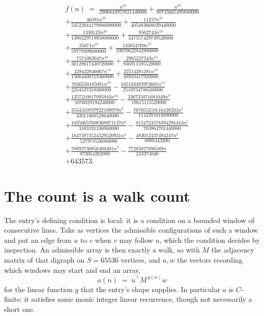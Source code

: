 \documentclass[11pt,a4paper]{article}
\theoremstyle{plain}
\theoremstyle{definition}
\begin{document}
\begin{multline*}
f(n)\;=\;\frac{n^{24}}{2906843957821440000} + \frac{n^{23}}{80745665495040000} \\
+ \frac{46391 n^{22}}{53523844179886080000} + \frac{11257 n^{21}}{405483668029440000} \\
+ \frac{1330123 n^{20}}{1390229718958080000} + \frac{8502743 n^{19}}{347557429739520000} \\
+ \frac{35671 n^{18}}{59779399680000} + \frac{133834769 n^{17}}{10670622842880000} \\
+ \frac{7571063047 n^{16}}{30128817438720000} + \frac{2965237343 n^{15}}{836911595520000} \\
+ \frac{328422846067 n^{14}}{15064408719360000} + \frac{22514281381 n^{13}}{48910417920000} \\
+ \frac{7036550185081 n^{12}}{2254537359360000} - \frac{105103493973601 n^{11}}{2510734786560000} \\
+ \frac{1257210817095943 n^{10}}{1076029194240000} - \frac{236735071681049 n^{9}}{19615115520000} \\
+ \frac{3534310707922188979 n^{8}}{32011868528640000} - \frac{767055210116438233 n^{7}}{1143281018880000} \\
+ \frac{10350657608308971137 n^{6}}{3103191336960000} - \frac{8154723578394294443 n^{5}}{703964701440000} \\
+ \frac{16475873524529520931 n^{4}}{527973526080000} - \frac{482012437494247 n^{3}}{8888443200} \\
+ \frac{78892730856408401 n^{2}}{873054262080} - \frac{77283877096589 n}{243374040} \\
+ 643573.
\end{multline*}

\section{The count is a walk count}

The entry's defining condition is local: it is a condition on a bounded window of consecutive lines. Take as vertices the
admissible configurations of such a window and put an edge from $u$ to $v$ when $v$ may
follow $u$, which the condition decides by inspection. An admissible array is then exactly a
walk, so with $M$ the adjacency matrix of that digraph on $S=65536$ vertices, and $u,w$ the
vectors recording which windows may start and end an array,
\[
a(n)\;=\;u^{\!\top}M^{\,g(n)}w
\]
for the linear function $g$ that the entry's shape supplies. In particular $a$ is
$C$-finite: it satisfies some monic integer linear recurrence, though not necessarily a short
one.
\end{document}
